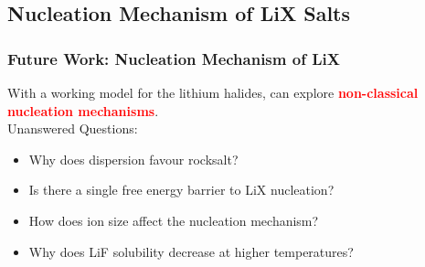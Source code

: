 \documentclass{beamer}
\newcommand{\bb}[1]{\textcolor{red}{\textbf{#1}}}
\begin{document}
\subsection{Nucleation Mechanism of LiX Salts}
\begin{frame}
\frametitle{Future Work: Nucleation Mechanism of LiX}
With a working model for the lithium halides, can explore \bb{non-classical nucleation mechanisms}.\\
Unanswered Questions:
\begin{itemize}
	\item Why does dispersion favour rocksalt?
	\item Is there a single free energy barrier to LiX nucleation?
	\item How does ion size affect the nucleation mechanism?
	\item Why does LiF solubility decrease at higher temperatures?
\end{itemize}
\end{frame}
\end{document}
